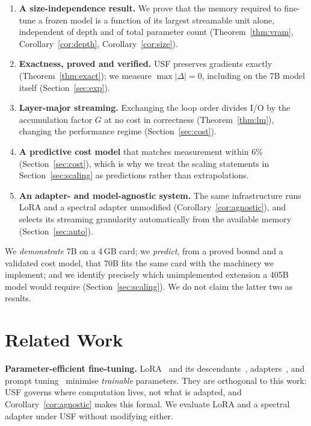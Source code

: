 \documentclass[preprint,12pt]{elsarticle}
\newcommand{\usf}{USF}
\begin{document}
\begin{enumerate}[leftmargin=*, label=\arabic*)]
\item \textbf{A size-independence result.} We prove that the memory required to fine-tune a frozen
model is a function of its largest streamable unit alone, independent of depth and of total
parameter count (Theorem~\ref{thm:vram}, Corollary~\ref{cor:depth}, Corollary~\ref{cor:size}).
\item \textbf{Exactness, proved and verified.} \usf{} preserves gradients exactly
(Theorem~\ref{thm:exact}); we measure $\max|\Delta|=0$, including on the 7B model itself
(Section~\ref{sec:exp}).
\item \textbf{Layer-major streaming.} Exchanging the loop order divides I/O by the accumulation
factor $G$ at no cost in correctness (Theorem~\ref{thm:lm}), changing the performance regime
(Section~\ref{sec:cost}).
\item \textbf{A predictive cost model} that matches measurement within 6\% (Section~\ref{sec:cost}),
which is why we treat the scaling statements in Section~\ref{sec:scaling} as predictions rather than
extrapolations.
\item \textbf{An adapter- and model-agnostic system.} The same infrastructure runs LoRA and a
spectral adapter unmodified (Corollary~\ref{cor:agnostic}), and selects its streaming granularity
automatically from the available memory (Section~\ref{sec:auto}).
\end{enumerate}

We \emph{demonstrate} 7B on a 4\,GB card; we \emph{predict}, from a
proved bound and a validated cost model, that 70B fits the same card with the machinery we
implement; and we identify precisely which unimplemented extension a 405B model would require
(Section~\ref{sec:scaling}). We do not claim the latter two as results.

\section{Related Work}
\label{sec:related}

\textbf{Parameter-efficient fine-tuning.} LoRA~\cite{hu2022lora} and its
descendants~\cite{liu2024dora}, adapters~\cite{houlsby2019adapters}, and prompt
tuning~\cite{lester2021prompt} minimise \emph{trainable} parameters. They are orthogonal to this
work: \usf{} governs where computation lives, not what is adapted, and
Corollary~\ref{cor:agnostic} makes this formal. We evaluate LoRA and a spectral adapter under \usf{} without
modifying either.
\end{document}

